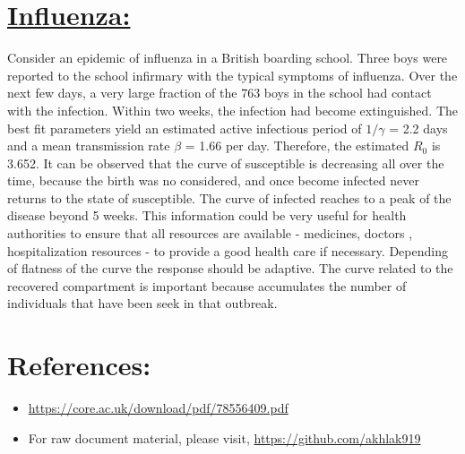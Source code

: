 \documentclass[12pt,a4paper]{article}
\begin{document}
    \section*{\underline{{\bf Influenza:}}} 
    Consider an epidemic of influenza in a British boarding school. Three boys were reported to the school infirmary with the typical symptoms of influenza. Over the next few days, a very large fraction of the 763 boys in the
    school had contact with the infection. Within two weeks, the
    infection had become extinguished. The best fit parameters
    yield an estimated active infectious period of $1/\gamma$ = 2.2 days
    and a mean transmission rate $\beta$ = 1.66 per day. Therefore,
    the estimated $R_0$ is 3.652. It can be observed that the curve of susceptible is decreasing all over the time, because the birth was no considered, and once become infected never returns to the state of susceptible. The curve of infected reaches to a peak of the disease beyond 5 weeks. This information could be very useful for health authorities to ensure that all resources are available - medicines, doctors , hospitalization resources - to provide a good health care if necessary. Depending of flatness of the curve the response should be adaptive. The curve related to the recovered compartment is important because accumulates the number of individuals that have been seek in that outbreak.

    \section*{References:}
    

    \begin{itemize}
        \item \url{https://core.ac.uk/download/pdf/78556409.pdf}
        \item For raw document material, please visit, \url{https://github.com/akhlak919}
    \end{itemize}
\end{document}

